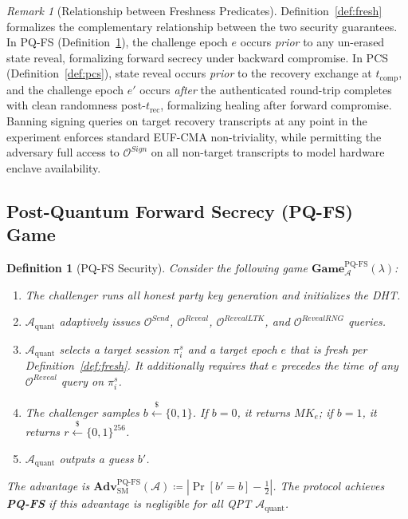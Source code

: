 \documentclass[11pt,a4paper]{article}
\newtheorem{definition}[theorem]{Definition}
\theoremstyle{remark}
\newtheorem{remark}[theorem]{Remark}
\theoremstyle{plain}
\newcommand{\Adv}{\mathbf{Adv}}
\newcommand{\PGame}{\mathbf{Game}}
\newcommand{\calA}{\mathcal{A}}
\newcommand{\calO}{\mathcal{O}}
\newcommand{\bits}{\{0,1\}}
\newcommand{\getsr}{\stackrel{\$}{\leftarrow}}
\begin{document}
\begin{remark}[Relationship between Freshness Predicates]
Definition~\ref{def:fresh} formalizes the complementary relationship between the two security guarantees.  In PQ-FS (Definition~\ref{def:pqfs}), the challenge epoch $e$ occurs \emph{prior} to any un-erased state reveal, formalizing forward secrecy under backward compromise.  In PCS (Definition~\ref{def:pcs}), state reveal occurs \emph{prior} to the recovery exchange at $t_{\mathrm{comp}}$, and the challenge epoch $e'$ occurs \emph{after} the authenticated round-trip completes with clean randomness post-$t_{\mathrm{rec}}$, formalizing healing after forward compromise.  Banning signing queries on target recovery transcripts at any point in the experiment enforces standard EUF-CMA non-triviality, while permitting the adversary full access to $\calO^{Sign}$ on all non-target transcripts to model hardware enclave availability.
\end{remark}

\subsection{Post-Quantum Forward Secrecy (PQ-FS) Game}

\begin{definition}[PQ-FS Security]
\label{def:pqfs}
Consider the following game $\PGame^{\mathrm{PQ\text{-}FS}}_{\calA}(\lambda)$:
\begin{enumerate}
  \item The challenger runs all honest party key generation and initializes the DHT.
  \item $\calA_{\mathrm{quant}}$ adaptively issues $\calO^{Send}$, $\calO^{Reveal}$,
        $\calO^{RevealLTK}$, and $\calO^{RevealRNG}$ queries.
  \item $\calA_{\mathrm{quant}}$ selects a target session $\pi^s_i$ and a target epoch $e$
        that is fresh per Definition~\ref{def:fresh}.  It additionally requires that $e$
        precedes the time of any $\calO^{Reveal}$ query on $\pi^s_i$.
  \item The challenger samples $b \getsr \bits$.  If $b = 0$, it returns $MK_e$; if $b = 1$,
        it returns $r \getsr \bits^{256}$.
  \item $\calA_{\mathrm{quant}}$ outputs a guess $b'$.
\end{enumerate}
The advantage is $\Adv^{\mathrm{PQ\text{-}FS}}_{\mathrm{SM}}(\calA) \coloneqq
|\Pr[b' = b] - \tfrac{1}{2}|$.  The protocol achieves \textbf{PQ-FS} if this advantage is
negligible for all QPT $\calA_{\mathrm{quant}}$.
\end{definition}
\end{document}
